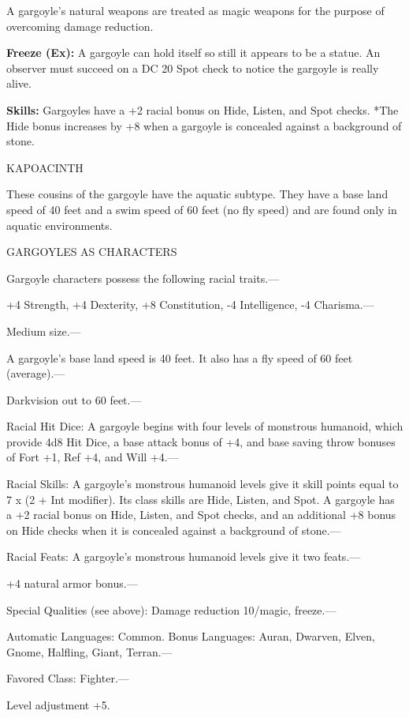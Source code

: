 \documentclass{article}
\begin{document}
A gargoyle's natural weapons are treated as magic weapons for the purpose of overcoming 
damage reduction.

\textbf{Freeze (Ex):} A gargoyle can hold itself so still it appears to be a statue. 
An observer must succeed on a DC 20 Spot check to notice the gargoyle is really 
alive.

\textbf{Skills:} Gargoyles have a +2 racial bonus on Hide, Listen, and Spot checks. 
*The Hide bonus increases by +8 when a gargoyle is concealed against a background 
of stone.

KAPOACINTH

These cousins of the gargoyle have the aquatic subtype. They have a base land speed 
of 40 feet and a swim speed of 60 feet (no fly speed) and are found only in aquatic 
environments.

GARGOYLES AS CHARACTERS

Gargoyle characters possess the following racial traits.--- 

\parindent=3pt
+4 Strength, +4 Dexterity, +8 Constitution, -4 Intelligence, -4 Charisma.---

\parindent=0pt
Medium size.---

A gargoyle's base land speed is 40 feet. It also has a fly speed of 60 feet (average).---

Darkvision out to 60 feet.---

Racial Hit Dice: A gargoyle begins with four levels of monstrous humanoid, which 
provide 4d8 Hit Dice, a base attack bonus of +4, and base saving throw bonuses 
of Fort +1, Ref +4, and Will +4.---

Racial Skills: A gargoyle's monstrous humanoid levels give it skill points equal 
to 7 x $ $(2 + Int modifier). Its class skills are Hide, Listen, and Spot. A gargoyle 
has a +2 racial bonus on Hide, Listen, and Spot checks, and an additional +8 bonus 
on Hide checks when it is concealed against a background of stone.---

Racial Feats: A gargoyle's monstrous humanoid levels give it two feats.--- 

\parindent=3pt
+4 natural armor bonus.---

\parindent=0pt
Special Qualities (see above): Damage reduction 10/magic, freeze.---

Automatic Languages: Common. Bonus Languages: Auran, Dwarven, Elven, Gnome, Halfling, 
Giant, Terran.---

Favored Class: Fighter.---

Level adjustment +5.
\end{document}
